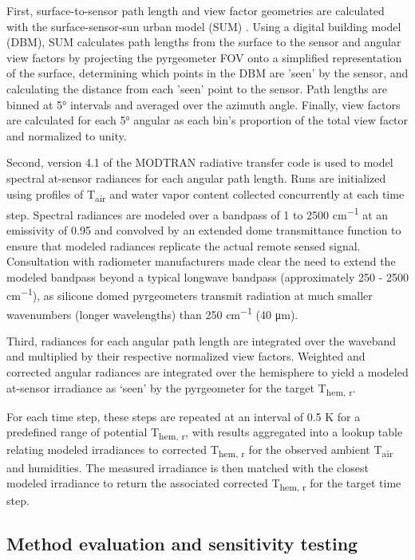 \begin{bibunit}
First, surface-to-sensor path length and view factor geometries are calculated with the surface-sensor-sun urban model (SUM) \citep{Soux2004}. Using a digital building model (DBM), SUM calculates path lengths from the surface to the sensor and angular view factors by projecting the pyrgeometer FOV onto a simplified representation of the surface, determining which points in the DBM are 'seen' by the sensor, and calculating the distance from each 'seen' point to the sensor. Path lengths are binned at 5\si{\degree} intervals and averaged over the azimuth angle. Finally, view factors are calculated for each 5\si{\degree} angular as each bin's proportion of the total view factor and normalized to unity.

Second, version 4.1 of the MODTRAN radiative transfer code \citep{Berk1987} is used to model spectral at-sensor radiances for each angular path length. Runs are initialized using profiles of T\textsubscript{air} and water vapor content collected concurrently at each time step. Spectral radiances are modeled over a bandpass of 1 to 2500 \si{cm^{-1}} at an emissivity of 0.95 and convolved by an extended dome transmittance function to ensure that modeled radiances replicate the actual remote sensed signal. Consultation with radiometer manufacturers made clear the need to extend the modeled bandpass beyond a typical longwave bandpass (approximately 250 - 2500 \si{cm^{-1}}), as silicone domed pyrgeometers transmit radiation at much smaller wavenumbers (longer wavelengths) than 250 \si{cm^{-1}} (40 \si{\micro\meter}).

Third, radiances for each angular path length are integrated over the waveband and multiplied by their respective normalized view factors. Weighted and corrected angular radiances are integrated over the hemisphere to yield a modeled at-sensor irradiance as ‘seen’ by the pyrgeometer for the target T\textsubscript{hem, r}. 

For each time step, these steps are repeated at an interval of 0.5 \si{\kelvin} for a predefined range of potential T\textsubscript{hem, r}, with results aggregated into a lookup table relating modeled irradiances to corrected T\textsubscript{hem, r} for the observed ambient T\textsubscript{air} and humidities. The measured irradiance is then matched with the closest modeled irradiance to return the associated corrected T\textsubscript{hem, r} for the target time step. 

\subsection{Method evaluation and sensitivity testing}


\end{bibunit}
